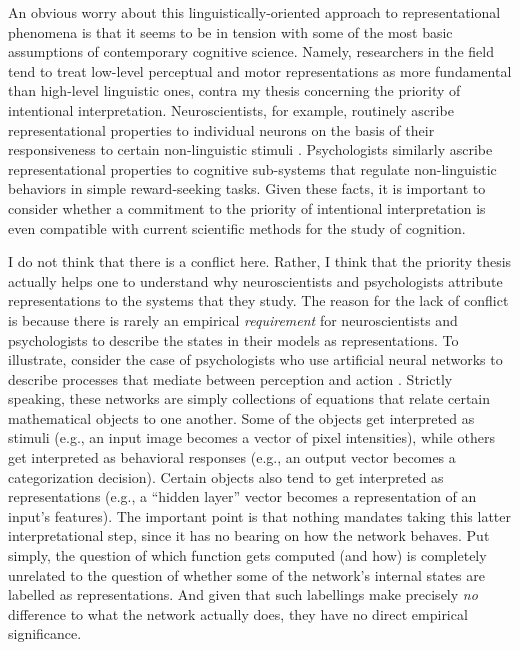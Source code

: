 An obvious worry about this linguistically-oriented approach to representational phenomena is that it seems to be in tension with some of the most basic assumptions of contemporary cognitive science. Namely, researchers in the field tend to treat low-level perceptual and motor representations as more fundamental than high-level linguistic ones, contra my thesis concerning the priority of intentional interpretation. Neuroscientists, for example, routinely ascribe representational properties to individual neurons on the basis of their responsiveness to certain non-linguistic stimuli \citep{Eliasmith:2000,EliasmithAnderson:2003,Eliasmith:2013}. Psychologists similarly ascribe representational properties to cognitive sub-systems that regulate non-linguistic behaviors in simple reward-seeking tasks. Given these facts, it is important to consider whether a commitment to the priority of intentional interpretation is even compatible with current scientific methods for the study of cognition. 

I do not think that there is a conflict here. Rather, I think that the priority thesis actually helps one to understand why neuroscientists and psychologists attribute representations to the systems that they study. The reason for the lack of conflict is because there is rarely an empirical \textit{requirement} for neuroscientists and psychologists to describe the states in their models as representations. To illustrate, consider the case of psychologists who use artificial neural networks to describe processes that mediate between perception and action \citep[e.g.,][]{SmolenskyLegendre:2006,McClelland:2010,Elman:1990,Elman:1991}. Strictly speaking, these networks are simply collections of equations that relate certain mathematical objects to one another. Some of the objects get interpreted as stimuli (e.g., an input image becomes a vector of pixel intensities), while others get interpreted as behavioral responses (e.g., an output vector becomes a categorization decision). Certain objects also tend to get interpreted as representations (e.g., a ``hidden layer'' vector becomes a representation of an input's features). The important point is that nothing mandates taking this latter interpretational step, since it has no bearing on how the network behaves. Put simply, the question of which function gets computed (and how) is completely unrelated to the question of whether some of the network's internal states are labelled as representations. And given that such labellings make precisely \textit{no} difference to what the network actually does, they have no direct empirical significance. 

